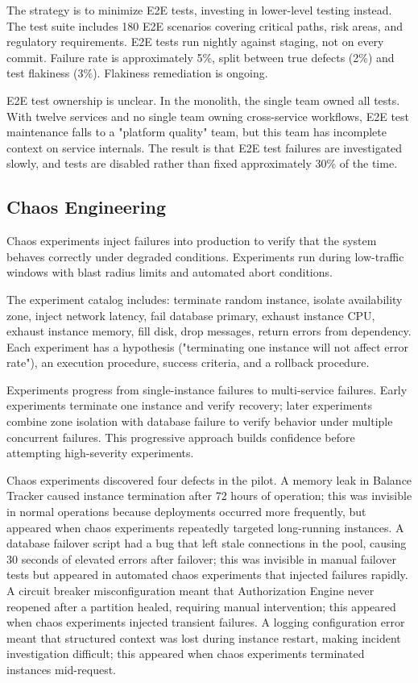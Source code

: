 The strategy is to minimize E2E tests, investing in lower-level testing instead. The test suite includes 180 E2E scenarios covering critical paths, risk areas, and regulatory requirements. E2E tests run nightly against staging, not on every commit. Failure rate is approximately 5\%, split between true defects (2\%) and test flakiness (3\%). Flakiness remediation is ongoing.

E2E test ownership is unclear. In the monolith, the single team owned all tests. With twelve services and no single team owning cross-service workflows, E2E test maintenance falls to a "platform quality" team, but this team has incomplete context on service internals. The result is that E2E test failures are investigated slowly, and tests are disabled rather than fixed approximately 30\% of the time.

\subsection{Chaos Engineering}

Chaos experiments inject failures into production to verify that the system behaves correctly under degraded conditions. Experiments run during low-traffic windows with blast radius limits and automated abort conditions.

The experiment catalog includes: terminate random instance, isolate availability zone, inject network latency, fail database primary, exhaust instance CPU, exhaust instance memory, fill disk, drop messages, return errors from dependency. Each experiment has a hypothesis ("terminating one instance will not affect error rate"), an execution procedure, success criteria, and a rollback procedure.

Experiments progress from single-instance failures to multi-service failures. Early experiments terminate one instance and verify recovery; later experiments combine zone isolation with database failure to verify behavior under multiple concurrent failures. This progressive approach builds confidence before attempting high-severity experiments.

Chaos experiments discovered four defects in the pilot. A memory leak in Balance Tracker caused instance termination after 72 hours of operation; this was invisible in normal operations because deployments occurred more frequently, but appeared when chaos experiments repeatedly targeted long-running instances. A database failover script had a bug that left stale connections in the pool, causing 30 seconds of elevated errors after failover; this was invisible in manual failover tests but appeared in automated chaos experiments that injected failures rapidly. A circuit breaker misconfiguration meant that Authorization Engine never reopened after a partition healed, requiring manual intervention; this appeared when chaos experiments injected transient failures. A logging configuration error meant that structured context was lost during instance restart, making incident investigation difficult; this appeared when chaos experiments terminated instances mid-request.

